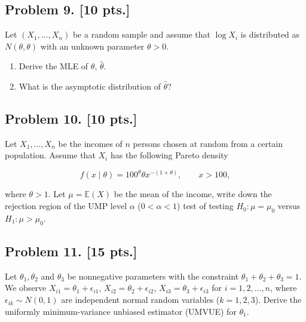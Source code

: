 \documentclass[11pt,a4paper]{article}
\begin{document}
\subsection{Problem 9. [10 pts.]}
Let \( (X_1, \dots, X_n) \) be a random sample and assume that \( \log X_i \) is distributed as \( N(\theta, \theta) \) with an unknown parameter \( \theta > 0 \).
\begin{enumerate}[label=(\alph*)]
    \item Derive the MLE of \( \theta \), \( \hat{\theta} \).
    \item What is the asymptotic distribution of \( \hat{\theta} \)?
\end{enumerate}

\subsection{Problem 10. [10 pts.]}
Let \( X_1, \dots, X_n \) be the incomes of \( n \) persons chosen at random from a certain population. Assume that \( X_i \) has the following Pareto density

\[
f(x \mid \theta) = 100^{\theta} \theta x^{-(1+\theta)}, \qquad x > 100,
\]

where \( \theta > 1 \). Let \( \mu = \mathbb{E}(X) \) be the mean of the income, write down the rejection region of the UMP level \( \alpha \) (\( 0 < \alpha < 1 \)) test of testing \( H_0 : \mu = \mu_0 \) versus \( H_1 : \mu > \mu_0 \).

\subsection{Problem 11. [15 pts.]}
Let \( \theta_1, \theta_2 \) and \( \theta_3 \) be nonnegative parameters with the constraint \( \theta_1 + \theta_2 + \theta_3 = 1 \). We observe \( X_{i1} = \theta_1 + \epsilon_{i1} \), \( X_{i2} = \theta_2 + \epsilon_{i2} \), \( X_{i3} = \theta_3 + \epsilon_{i3} \) for \( i = 1, 2, \dots, n \), where \( \epsilon_{ik} \sim N(0, 1) \) are independent normal random variables (\( k = 1, 2, 3 \)). Derive the uniformly minimum-variance unbiased estimator (UMVUE) for \( \theta_1 \).
\end{document}
